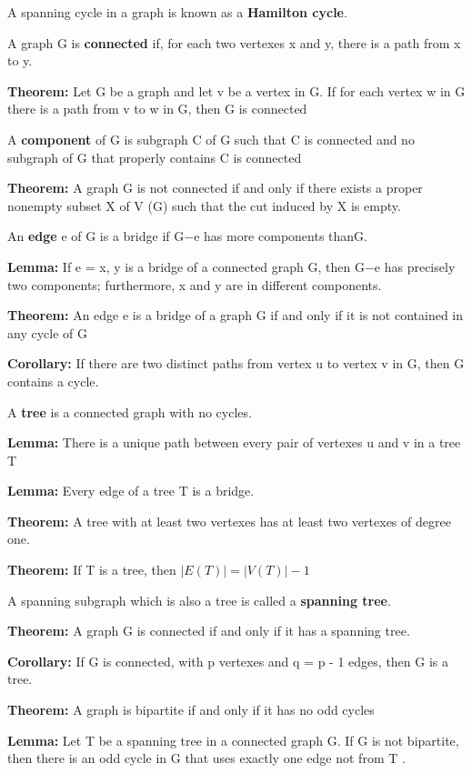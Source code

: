 \documentclass[12pt]{article}
\begin{document}
A spanning cycle in a graph is known as a \textbf{Hamilton cycle}.

A graph G is \textbf{connected} if, for each two vertexes x and y, there is a path from x to y.

\textbf{Theorem:} Let G be a graph and let v be a vertex in G. If for each vertex w
in G there is a path from v to w in G, then G is connected

A \textbf{component} of G is subgraph C of G such that C is connected and no subgraph of G that properly contains C is connected

\textbf{Theorem:} A graph G is not connected if and only if there exists a proper nonempty subset X of V (G) such that the cut induced by X is empty.

An \textbf{edge} e of G is a bridge if G−e has more components thanG.

\textbf{Lemma:} If e = {x, y} is a bridge of a connected graph G, then G−e has precisely two components; furthermore, x and y are in different components.

\textbf{Theorem:} An edge e is a bridge of a graph G if and only if it is not contained in any cycle of G

\textbf{Corollary:} If there are two distinct paths from vertex u to vertex v in G, then G contains a cycle.

A \textbf{tree} is a connected graph with no cycles.

\textbf{Lemma:} There is a unique path between every pair of vertexes u and v in a tree T

\textbf{Lemma:} Every edge of a tree T is a bridge.

\textbf{Theorem:} A tree with at least two vertexes has at least two vertexes of degree one.

\textbf{Theorem:} If T is a tree, then $|E (T )| = |V (T )| − 1$

A spanning subgraph which is also a tree is called a \textbf{spanning tree}.

\textbf{Theorem:} A graph G is connected if and only if it has a spanning tree.

\textbf{Corollary:} If G is connected, with p vertexes and q = p - 1 edges, then G is a tree.

\textbf{Theorem:} A graph is bipartite if and only if it has no odd cycles

\textbf{Lemma:} Let T be a spanning tree in a connected graph G. If G is not bipartite, then there is an odd cycle in G that uses exactly one edge not from T .
\end{document}
